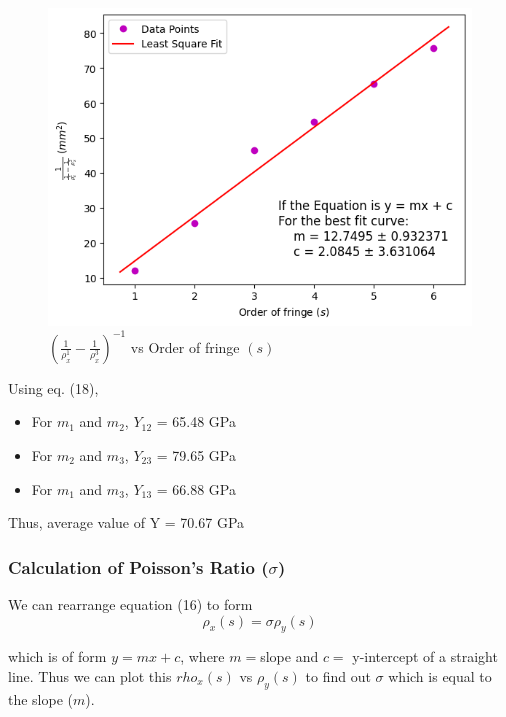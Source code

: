     \begin{figure}[H]
        \centering
        \label{graph:3}
        \includegraphics[width=0.8\columnwidth]{images/3.png}
        \caption{$(\frac{1}{\rho_{x}^1}-\frac{1}{\rho_{x}^3})^{-1}$ vs Order of fringe $(s)$}
    \end{figure}

    Using eq. (18),
   \begin{itemize}
       \item For $m_1$ and $m_2$, $Y_{12}$ = 65.48 GPa
       \item For $m_2$ and $m_3$, $Y_{23}$ = 79.65 GPa
       \item For $m_1$ and $m_3$, $Y_{13}$ = 66.88 GPa
   \end{itemize}

   Thus, average value of Y = 70.67 GPa

   \subsubsection{Calculation of Poisson's Ratio ($\sigma$)}

     We can rearrange equation (16) to form 
     \begin{equation}
         \rho_x(s) = \sigma \rho_y(s)
     \end{equation}

      which is of form $y=mx+c$, where $m=$slope and $c=$ y-intercept of a straight line. Thus we can plot this $rho_x(s)$ vs $\rho_y(s)$ to find out $\sigma$ which is equal to the slope ($m$).

